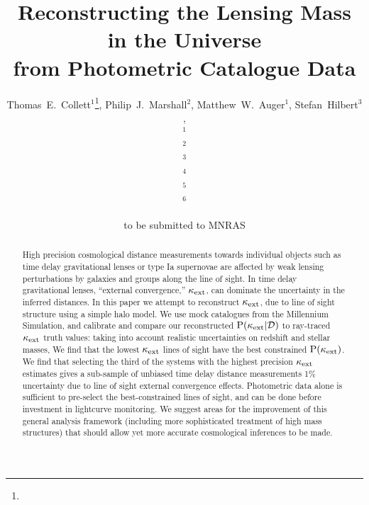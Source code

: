 \documentclass[useAMS,usenatbib,a4paper]{mn2e}
\title[Line of Sight Mass Reconstruction]
{Reconstructing the Lensing Mass in the Universe \\
from Photometric Catalogue Data}
\author[Collett \etal]{%
  Thomas~E.~Collett$^{1}$\thanks{\collettemail},
  Philip~J.~Marshall$^{2}$,
  Matthew~W.~Auger$^{1}$,
  Stefan~Hilbert$^{3}$,
\newauthor{%
  Sherry~H.~Suyu$^{4}$,
  Zachary~Greene$^{4}$,
  Tommaso~Treu$^{4}$\thanks{\packard},
  Christopher~D.~Fassnacht$^{5}$,}
\newauthor{%
  L\'eon~V.~E.~Koopmans$^{6}$,
  Maru\v{s}a Brada\v{c}$^{5}$,
  Roger~D.~Blandford$^{3}$} 
  \medskip\\
  $^1$\ioa\\
  $^2$\oxford\\
  $^3$\kipac\\
  $^4$\ucsb\\
  $^5$\davis\\
  $^6$\kapteyn
}
\begin{document}
             
\date{to be submitted to MNRAS}
\pagerange{\pageref{firstpage}--\pageref{lastpage}}

\maketitle           

\label{firstpage}


\begin{abstract} 

High precision cosmological distance measurements towards individual objects
such as time delay gravitational lenses or type Ia supernovae are affected by
weak lensing perturbations by galaxies and groups along the line of sight. In
time delay gravitational lenses, ``external convergence,'' $\kappa_{\rm ext}$, can
dominate the uncertainty in the inferred distances. In this paper we attempt
to reconstruct $\kappa_{\rm ext}$, due to line of sight structure using a simple halo
model.
%
We use mock catalogues from the Millennium Simulation, and calibrate and 
compare our reconstructed ${\rm P}(\kappa_{\rm ext}|{\mathcal{D}})$ to ray-traced $\kappa_{\rm ext}$ truth
values:  taking into account realistic uncertainties on redshift and stellar
masses,  
%
We find that the lowest $\kappa_{\rm ext}$ lines of sight have the best constrained 
${\rm P}(\kappa_{\rm ext})$. We find that selecting the third of the systems with the
highest precision $\kappa_{\rm ext}$ estimates gives a  sub-sample of unbiased time
delay distance measurements  1\% uncertainty due
to line of sight external convergence effects. Photometric data alone is
sufficient to pre-select the best-constrained lines of sight, and can be done
before investment in lightcurve monitoring. 
%
  We suggest areas for the
improvement of this general analysis framework (including more sophisticated
treatment of high mass structures) that should allow yet more accurate
cosmological inferences to be made.

\end{abstract}

\end{document}
